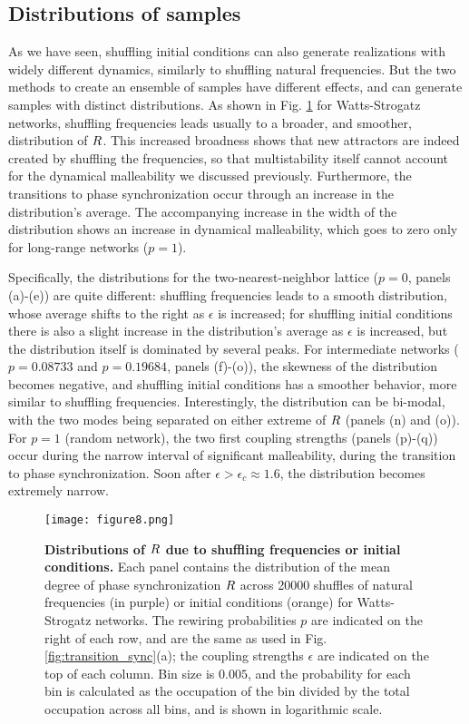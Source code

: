 \subsection{Distributions of samples}
As we have seen, shuffling initial conditions can also generate realizations with widely different dynamics, similarly to shuffling natural frequencies. But the two methods to create an ensemble of samples have different effects, and can generate samples with distinct distributions. As shown in Fig. \ref{fig:Rdistributions} for Watts-Strogatz networks, shuffling frequencies leads usually to a broader, and smoother, distribution of $R$. This increased broadness shows that new attractors are indeed created by shuffling the frequencies, so that multistability itself cannot account for the dynamical malleability we discussed previously. Furthermore, the transitions to phase synchronization occur through an increase in the distribution's average. The accompanying increase in the width of the distribution shows an increase in dynamical malleability, which goes to zero only for long-range networks ($p = 1$). 

Specifically, the distributions for the two-nearest-neighbor lattice ($p = 0$, panels (a)-(e)) are quite different: shuffling frequencies leads to a smooth distribution, whose average shifts to the right as $\epsilon$ is increased; for shuffling initial conditions there is also a slight increase in the distribution's average as $\epsilon$ is increased, but the distribution itself is dominated by several peaks. 
For intermediate networks ($p = 0.08733$ and $p = 0.19684$, panels (f)-(o)), the skewness of the distribution becomes negative, and shuffling initial conditions has a smoother behavior, more similar to shuffling frequencies. Interestingly, the distribution can be bi-modal, with the two modes being separated on either extreme of $R$ (panels (n) and (o)). 
For $p = 1$ (random network), the two first coupling strengths (panels (p)-(q)) occur during the narrow interval of significant malleability, during the transition to phase synchronization. Soon after $\epsilon > \epsilon_c \approx 1.6$, the distribution becomes extremely narrow. 
%
\begin{figure*}[htb!]
    \centering
    \texttt{[image: figure8.png]}
    \caption{\textbf{Distributions of $R$ due to shuffling frequencies or initial conditions.} Each panel contains the distribution of the mean degree of phase synchronization $R$ across 20000 shuffles of natural frequencies (in purple) or initial conditions (orange) for Watts-Strogatz networks. The rewiring probabilities $p$ are indicated on the right of each row, and are the same as used in Fig. \ref{fig:transition_sync}(a); the coupling strengths $\epsilon$ are indicated on the top of each column. Bin size is $0.005$, and the probability for each bin is calculated as the occupation of the bin divided by the total occupation across all bins, and is shown in logarithmic scale.}
    \label{fig:Rdistributions}
\end{figure*}

